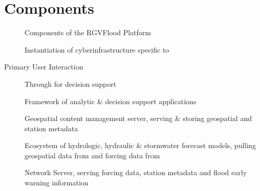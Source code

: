 \documentclass[letterpaper,10pt,english]{sphinxmanual}
\begin{document}
\section{Components}
\label{\detokenize{predevelopment/components/index:components}}\label{\detokenize{predevelopment/components/index::doc}}
\begin{figure}[htbp]
\centering
\capstart

\noindent{}
\caption{Components of the RGVFlood Platform}\label{\detokenize{predevelopment/components/index:id1}}\end{figure}
\begin{description}
\item[{{\hyperref[\detokenize{glossary:term-RGVFlood}]{}}}] \leavevmode
\sphinxAtStartPar
Instantiation of {\hyperref[\detokenize{glossary:term-REON}]{}} cyberinfrastructure specific to {\hyperref[\detokenize{glossary:term-LRGV}]{}}

\item[{Primary User Interaction}] \leavevmode
\sphinxAtStartPar
Through {\hyperref[\detokenize{glossary:term-REON.cc}]{}} for decision support

\item[{{\hyperref[\detokenize{glossary:term-REON.cc}]{}}}] \leavevmode
\sphinxAtStartPar
Framework of {\hyperref[\detokenize{glossary:term-REON}]{}} analytic \& decision support applications

\item[{{\hyperref[\detokenize{glossary:term-GeoNode}]{}}}] \leavevmode
\sphinxAtStartPar
Geospatial content management server, serving \& storing geospatial and {\hyperref[\detokenize{glossary:term-RTHS}]{}} station metadata

\item[{{\hyperref[\detokenize{glossary:term-REON-WM}]{}}}] \leavevmode
\sphinxAtStartPar
Ecosystem of hydrologic, hydraulic \& stormwater forecast models, pulling geospatial data from {\hyperref[\detokenize{glossary:term-GeoNode}]{}} and forcing data from {\hyperref[\detokenize{glossary:term-RTHS.us}]{}}

\item[{{\hyperref[\detokenize{glossary:term-RTHS.us}]{}}}] \leavevmode
\sphinxAtStartPar
{\hyperref[\detokenize{glossary:term-RTHS}]{}} Network Server, serving forcing data, station metadata and flood early warning information

\end{description}
\end{document}
